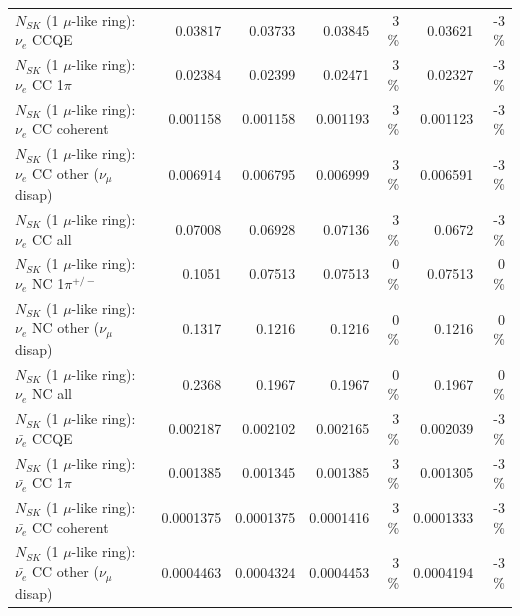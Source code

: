 \begin{table}
\begin{tabular}{| l | r | r | r  r | r  r |}
\hline
\hline
\hline
                                      $N_{SK}$ (1 $\mu$-like ring): $\nu_e$ CCQE &         0.03817 &         0.03733 &         0.03845 &        3 \%  &         0.03621 &       -3 \%  \\ 
                                 $N_{SK}$ (1 $\mu$-like ring): $\nu_e$ CC 1$\pi$ &         0.02384 &         0.02399 &         0.02471 &        3 \%  &         0.02327 &       -3 \%  \\ 
                               $N_{SK}$ (1 $\mu$-like ring): $\nu_e$ CC coherent &        0.001158 &        0.001158 &        0.001193 &        3 \%  &        0.001123 &       -3 \%  \\ 
                $N_{SK}$ (1 $\mu$-like ring): $\nu_e$ CC other ($\nu_\mu$ disap) &        0.006914 &        0.006795 &        0.006999 &        3 \%  &        0.006591 &       -3 \%  \\ 
                                  $N_{SK}$ (1 $\mu$-like ring): $\nu_{e}$ CC all &         0.07008 &         0.06928 &         0.07136 &        3 \%  &          0.0672 &       -3 \%  \\ 
\hline
                           $N_{SK}$ (1 $\mu$-like ring): $\nu_e$ NC 1$\pi^{+/-}$ &          0.1051 &         0.07513 &         0.07513 &        0 \%  &         0.07513 &        0 \%  \\ 
                $N_{SK}$ (1 $\mu$-like ring): $\nu_e$ NC other ($\nu_\mu$ disap) &          0.1317 &          0.1216 &          0.1216 &        0 \%  &          0.1216 &        0 \%  \\ 
                                  $N_{SK}$ (1 $\mu$-like ring): $\nu_{e}$ NC all &          0.2368 &          0.1967 &          0.1967 &        0 \%  &          0.1967 &        0 \%  \\ 
\hline
\hline
\hline
                                $N_{SK}$ (1 $\mu$-like ring): $\bar{\nu_e}$ CCQE &        0.002187 &        0.002102 &        0.002165 &        3 \%  &        0.002039 &       -3 \%  \\ 
                           $N_{SK}$ (1 $\mu$-like ring): $\bar{\nu_e}$ CC 1$\pi$ &        0.001385 &        0.001345 &        0.001385 &        3 \%  &        0.001305 &       -3 \%  \\ 
                         $N_{SK}$ (1 $\mu$-like ring): $\bar{\nu_e}$ CC coherent &       0.0001375 &       0.0001375 &       0.0001416 &        3 \%  &       0.0001333 &       -3 \%  \\ 
          $N_{SK}$ (1 $\mu$-like ring): $\bar{\nu_e}$ CC other ($\nu_\mu$ disap) &       0.0004463 &       0.0004324 &       0.0004453 &        3 \%  &       0.0004194 &       -3 \%  \\ 

\end{tabular}
\end{table}
